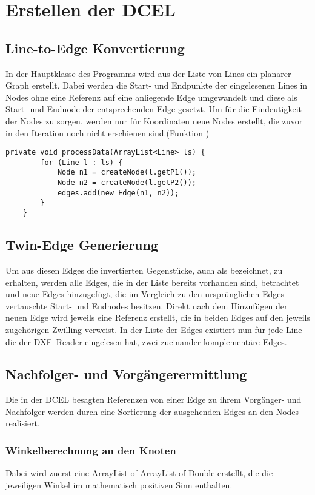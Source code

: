 \section{Erstellen der DCEL}
\subsection{Line-to-Edge Konvertierung}
In der Hauptklasse des Programms wird aus der Liste von Lines ein planarer Graph erstellt. 
Dabei werden die Start- und Endpunkte der eingelesenen Lines in Nodes ohne eine Referenz auf eine anliegende Edge umgewandelt und diese als Start- und Endnode der entsprechenden Edge gesetzt.
Um für die Eindeutigkeit der Nodes zu sorgen, werden nur für Koordinaten neue Nodes erstellt, die zuvor in den Iteration noch nicht erschienen sind.(Funktion )

\begin{lstlisting}[caption = {Line-to-Edge Konvertierung}]
	private void processData(ArrayList<Line> ls) {
		for (Line l : ls) {
			Node n1 = createNode(l.getP1());
			Node n2 = createNode(l.getP2());
			edges.add(new Edge(n1, n2));
		}
	}
\end{lstlisting}
\subsection{Twin-Edge Generierung}
Um aus diesen Edges die invertierten Gegenstücke, auch als  bezeichnet, zu erhalten, werden alle Edges, die in der Liste bereits vorhanden sind, betrachtet und neue Edges hinzugefügt, die im Vergleich zu den ursprünglichen Edges vertauschte Start- und Endnodes besitzen.
Direkt nach dem Hinzufügen der neuen Edge wird jeweils eine Referenz erstellt, die in beiden Edges auf den jeweils zugehörigen Zwilling verweist. 
In der Liste der Edges existiert nun für jede Line die der DXF--Reader eingelesen hat, zwei zueinander komplementäre Edges.
\subsection{Nachfolger- und Vorgängerermittlung}
Die in der DCEL besagten Referenzen von einer Edge zu ihrem Vorgänger- und Nachfolger werden durch eine Sortierung der ausgehenden Edges an den Nodes realisiert.
\subsubsection{Winkelberechnung an den Knoten}
Dabei wird zuerst eine ArrayList of ArrayList of Double erstellt, die die jeweiligen  Winkel im mathematisch positiven Sinn enthalten. 
